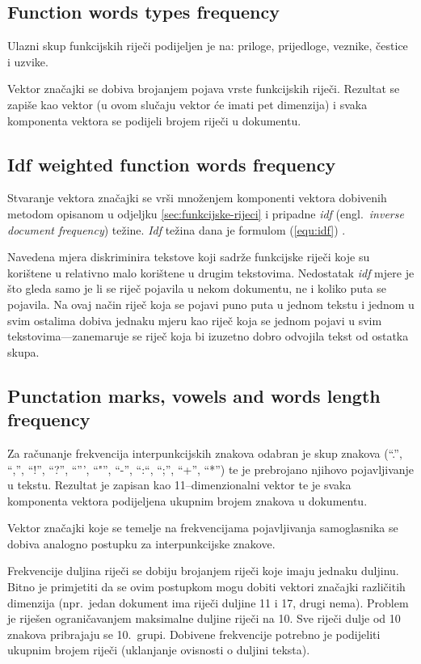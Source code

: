 \documentclass[11pt,english]{article}
\newcommand{\engl}[1]{(engl.~\emph{#1})}
\begin{document}
\begin{multicols}{2}
\subsection{Function words types frequency}
\label{sec:funkcijske-rijeci-grupe}
Ulazni skup funkcijskih riječi podijeljen je na: priloge, prijedloge, veznike,
čestice i uzvike.

Vektor značajki se dobiva brojanjem pojava vrste funkcijskih riječi. Rezultat
se zapiše kao vektor (u ovom slučaju vektor će imati pet dimenzija) i svaka
komponenta vektora se podijeli brojem riječi u dokumentu.

\subsection{Idf weighted function words frequency}
\label{sec:funkcijske-rijeci-idf}
Stvaranje vektora značajki se vrši množenjem komponenti vektora dobivenih metodom
opisanom u odjeljku \ref{sec:funkcijske-rijeci} i pripadne \emph{idf} \engl{inverse
document frequency} težine. \emph{Idf} težina dana je formulom (\ref{equ:idf})
\citep{diederich2003authorship}.

Navedena mjera diskriminira tekstove koji sadrže funkcijske riječi koje su
korištene u relativno malo korištene u drugim tekstovima. Nedostatak \emph{idf}
mjere je što gleda samo je li se riječ pojavila u nekom dokumentu, ne i koliko
puta se pojavila. Na ovaj način riječ koja se pojavi puno puta u jednom
tekstu i jednom u svim ostalima dobiva jednaku mjeru kao riječ koja se jednom
pojavi u svim tekstovima---zanemaruje se riječ koja bi izuzetno dobro
odvojila tekst od ostatka skupa.

\subsection{Punctation marks, vowels and words length frequency}
\label{sec:znacajke-manje}
Za računanje frekvencija interpunkcijskih znakova odabran je skup znakova (``.'',
``,'', ``!'', ``?'', ``''', ``"'', ``-'', ``:``, ``;'', ``+'', ``*'') te je
prebrojano njihovo pojavljivanje u tekstu. Rezultat je zapisan kao
11--dimenzionalni vektor te je svaka komponenta vektora podijeljena ukupnim
brojem znakova u dokumentu.

Vektor značajki koje se temelje na frekvencijama pojavljivanja samoglasnika se
dobiva analogno postupku za interpunkcijske znakove.

Frekvencije duljina riječi se dobiju brojanjem riječi koje imaju jednaku duljinu.
Bitno je primjetiti da se ovim postupkom mogu dobiti vektori značajki različitih
dimenzija (npr.~jedan dokument ima riječi duljine 11 i 17, drugi nema). Problem
je riješen ograničavanjem maksimalne duljine riječi na 10. Sve riječi dulje od 10
znakova pribrajaju se 10.~grupi. Dobivene frekvencije potrebno je podijeliti
ukupnim brojem riječi (uklanjanje ovisnosti o duljini teksta).


\end{multicols}
\end{document}
